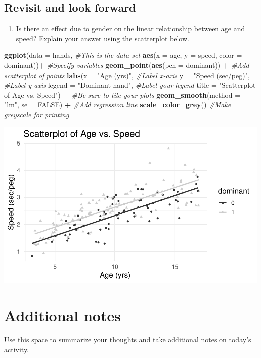 \documentclass[
]{report}
\newenvironment{Shaded}{\begin{snugshade}}{\end{snugshade}}
\newcommand{\CommentTok}[1]{\textcolor[rgb]{0.56,0.35,0.01}{\textit{#1}}}
\newcommand{\DataTypeTok}[1]{\textcolor[rgb]{0.13,0.29,0.53}{#1}}
\newcommand{\KeywordTok}[1]{\textcolor[rgb]{0.13,0.29,0.53}{\textbf{#1}}}
\newcommand{\NormalTok}[1]{#1}
\newcommand{\OperatorTok}[1]{\textcolor[rgb]{0.81,0.36,0.00}{\textbf{#1}}}
\newcommand{\OtherTok}[1]{\textcolor[rgb]{0.56,0.35,0.01}{#1}}
\newcommand{\StringTok}[1]{\textcolor[rgb]{0.31,0.60,0.02}{#1}}
\providecommand{\tightlist}{%
  \setlength{\itemsep}{0pt}\setlength{\parskip}{0pt}}
\begin{document}
\vspace{2in}

\hypertarget{revisit-and-look-forward}{%
\subsection{Revisit and look forward}\label{revisit-and-look-forward}}

\begin{enumerate}
\def\labelenumi{\arabic{enumi}.}
\setcounter{enumi}{19}
\tightlist
\item
  Is there an effect due to gender on the linear relationship between age and speed? Explain your answer using the scatterplot below.
\end{enumerate}

\begin{Shaded}
\begin{Highlighting}[]
\KeywordTok{ggplot}\NormalTok{(}\DataTypeTok{data =}\NormalTok{ hands,   }\CommentTok{\#This is the data set}
       \KeywordTok{aes}\NormalTok{(}\DataTypeTok{x =}\NormalTok{ age, }\DataTypeTok{y =}\NormalTok{ speed, }\DataTypeTok{color =}\NormalTok{ dominant))}\OperatorTok{+}\StringTok{  }\CommentTok{\#Specify variables}
\StringTok{  }\KeywordTok{geom\_point}\NormalTok{(}\KeywordTok{aes}\NormalTok{(}\DataTypeTok{pch =}\NormalTok{ dominant)) }\OperatorTok{+}\StringTok{  }\CommentTok{\#Add scatterplot of points}
\StringTok{  }\KeywordTok{labs}\NormalTok{(}\DataTypeTok{x =} \StringTok{"Age (yrs)"}\NormalTok{,  }\CommentTok{\#Label x{-}axis}
       \DataTypeTok{y =} \StringTok{"Speed (sec/peg)"}\NormalTok{,  }\CommentTok{\#Label y{-}axis}
       \DataTypeTok{legend =} \StringTok{"Dominant hand"}\NormalTok{,  }\CommentTok{\#Label your legend}
       \DataTypeTok{title =} \StringTok{"Scatterplot of Age vs. Speed"}\NormalTok{) }\OperatorTok{+}\StringTok{ }\CommentTok{\#Be sure to tile your plots}
\StringTok{  }\KeywordTok{geom\_smooth}\NormalTok{(}\DataTypeTok{method =} \StringTok{"lm"}\NormalTok{, }\DataTypeTok{se =} \OtherTok{FALSE}\NormalTok{) }\OperatorTok{+}\StringTok{  }\CommentTok{\#Add regression line}
\StringTok{  }\KeywordTok{scale\_color\_grey}\NormalTok{() }\CommentTok{\#Make greyscale for printing }
\end{Highlighting}
\end{Shaded}

\begin{center}\includegraphics[width=0.7\linewidth]{10-regression_files/figure-latex/unnamed-chunk-6-1} \end{center}

\hypertarget{additional-notes}{%
\section{Additional notes}\label{additional-notes}}

Use this space to summarize your thoughts and take additional notes on today's activity.
\end{document}
